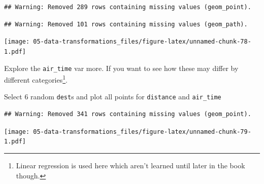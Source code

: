 \documentclass[]{book}
\newenvironment{Shaded}{\begin{snugshade}}{\end{snugshade}}
\newcommand{\DataTypeTok}[1]{\textcolor[rgb]{0.13,0.29,0.53}{#1}}
\newcommand{\DecValTok}[1]{\textcolor[rgb]{0.00,0.00,0.81}{#1}}
\newcommand{\KeywordTok}[1]{\textcolor[rgb]{0.13,0.29,0.53}{\textbf{#1}}}
\newcommand{\NormalTok}[1]{#1}
\newcommand{\OperatorTok}[1]{\textcolor[rgb]{0.81,0.36,0.00}{\textbf{#1}}}
\newcommand{\StringTok}[1]{\textcolor[rgb]{0.31,0.60,0.02}{#1}}
\let\rmarkdownfootnote\footnote%
\def\footnote{\protect\rmarkdownfootnote}
\theoremstyle{definition}
\theoremstyle{definition}
\theoremstyle{definition}
\theoremstyle{remark}
\begin{document}
\begin{verbatim}
## Warning: Removed 289 rows containing missing values (geom_point).
\end{verbatim}

\begin{verbatim}
## Warning: Removed 101 rows containing missing values (geom_path).
\end{verbatim}

\texttt{[image: 05-data-transformations\_files/figure-latex/unnamed-chunk-78-1.pdf]}

Explore the \texttt{air\_time} var more. If you want to see how these
may differ by different categories\footnote{Linear regression is used
  here which aren't learned until later in the book though.}.

Select 6 random \texttt{dest}s and plot all points for \texttt{distance}
and \texttt{air\_time}

\begin{Shaded}
\end{Shaded}

\begin{verbatim}
## Warning: Removed 341 rows containing missing values (geom_point).
\end{verbatim}

\texttt{[image: 05-data-transformations\_files/figure-latex/unnamed-chunk-79-1.pdf]}
\end{document}
